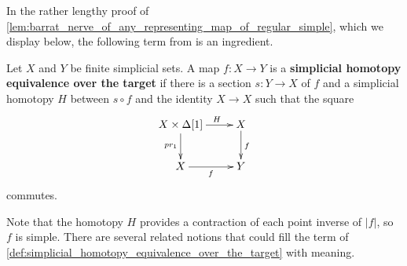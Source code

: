 In the rather lengthy proof of \cref{lem:barrat_nerve_of_any_representing_map_of_regular_simple}, which we display below, the following term from \cite[Def.~2.4.7]{WJR13} is an ingredient.
\begin{definition}
\label{def:simplicial_homotopy_equivalence_over_the_target}
Let $X$ and $Y$ be finite simplicial sets. A map $f:X\to Y$ is a \textbf{simplicial homotopy equivalence over the target} if there is a section $s:Y\to X$ of $f$ and a simplicial homotopy $H$ between $s\circ f$ and the identity $X\to X$ such that the square
\begin{displaymath}
\xymatrix{
X\times \Delta [1] \ar[d]_{pr_1} \ar[r]^(.6)H & X \ar[d]^f \\
X \ar[r]_f & Y
}
\end{displaymath}
commutes.
\end{definition}
\noindent Note that the homotopy $H$ provides a contraction of each point inverse of $\lvert f\rvert$, so $f$ is simple. There are several related notions that could fill the term of \cref{def:simplicial_homotopy_equivalence_over_the_target} \cite[p.~60]{WJR13} with meaning.

